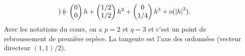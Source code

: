 \documentclass[a4paper]{tp_um}
\begin{document}
\begin{enumerate}
{\[\begin{pmatrix}
           \end{pmatrix} + \begin{pmatrix}
               0\\ 0
           \end{pmatrix}h + \begin{pmatrix}
               1/2 \\ 1/2
           \end{pmatrix}h^2 + \begin{pmatrix}
               0\\ 1/4
           \end{pmatrix}h^3 + o(\left\lvert h\right\rvert^3).
       \] 
       Avec les notations du cours, on a $p=2$ et $q=3$ et c'est un point de rebroussement de première espèce. La tangente est l'axe des ordonnées (vecteur directeur $(1,1)/2$).
 
}
\end{enumerate}
\end{document}
